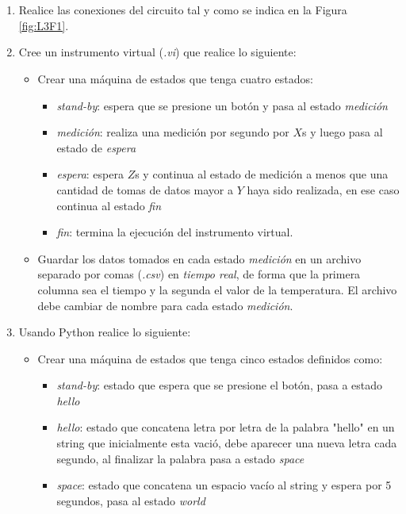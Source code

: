 \section{\pro}
\begin{enumerate}
\item Realice las conexiones del circuito tal y como se indica en la Figura \ref{fig:L3F1}.
\item Cree un instrumento virtual (\emph{.vi}) que realice lo siguiente:
    \begin{itemize}
        \item Crear una máquina de estados que tenga cuatro estados:
            \begin{itemize}
                \item \emph{stand-by}: espera que se presione un botón y pasa al estado \emph{medición}
                \item \emph{medición}: realiza una medición por segundo por $X$\si{\second} y luego pasa al estado de \emph{espera}
                \item \emph{espera}: espera $Z$\si{\second} y continua al estado de medición a menos que una cantidad de tomas de datos mayor a $Y$ haya sido realizada, en ese caso continua al estado  \emph{fin}
                \item \emph{fin}: termina la ejecución del instrumento virtual.
            \end{itemize}
        \item Guardar los datos tomados en cada estado \emph{medición} en un archivo separado por comas (\emph{.csv}) en \emph{tiempo real}, de forma que la primera columna sea el tiempo y la segunda el valor de la temperatura. El archivo debe cambiar de nombre para cada estado \emph{medición}. 
    \end{itemize}
\item Usando Python realice lo siguiente:
\begin{itemize}
    \item Crear una máquina de estados que tenga cinco estados definidos como:
        \begin{itemize}
            \item \emph{stand-by}: estado que espera que se presione el botón, pasa a estado \emph{hello}
            \item \emph{hello}: estado que concatena letra por letra de la palabra "hello" en un string que inicialmente esta vació, debe aparecer una nueva letra cada segundo, al finalizar la palabra pasa a estado \emph{space}
            \item \emph{space}: estado que concatena un espacio vacío al string y espera por 5 segundos, pasa al estado \emph{world}

\end{itemize}
\end{itemize}
\end{enumerate}
